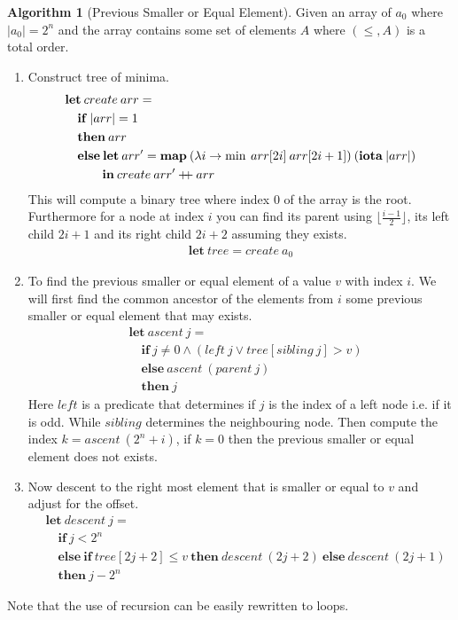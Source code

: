 \documentclass[a4paper,12pt]{article}
\newcommand\concat{\: \mathrlap{+} \: +}
\theoremstyle{definition}
\newtheorem{algorithm}{Algorithm}[section]
\begin{document}
\begin{algorithm}[Previous Smaller or Equal Element]\label{algo:psee}
  Given an array of $a_0$ where $|a_0| = 2^n$ and the array contains some set of elements $A$ where $(\leq, A)$ is a total order.
  \begin{enumerate}
    \item Construct tree of minima.
    \begin{align*}
      &\mathbf{let} \: create \: arr = \\
      &\quad \mathbf{if} \: |arr| = 1 \\
      &\quad \mathbf{then} \: arr \\
      &\quad \mathbf{else} \: \mathbf{let} \: arr' = \mathbf{map} \: (\lambda i \to \min \: arr[2i] \: arr[2i + 1] ) \: (\mathbf{iota} \: |arr|) \\
      &\quad \quad \quad \mathbf{in} \: create \: arr' \concat  arr
    \end{align*}
    This will compute a binary tree where index $0$ of the array is the root. Furthermore for a node at index $i$ you can find its parent using $\lfloor \frac{i - 1}{2} \rfloor$, its left child $2i + 1$ and its right child $2i + 2$ assuming they exists.
    \begin{align*}
      \mathbf{let} \: tree = create \: a_0
    \end{align*}
    \item To find the previous smaller or equal element of a value $v$ with index $i$. We will first find the common ancestor of the elements from $i$ some previous smaller or equal element that may exists. 
    \begin{align*}
      &\mathbf{let} \: ascent \: j = \\
      &\quad \mathbf{if} \: j \neq 0 \land (left \: j \lor tree[sibling \: j] > v) \\
      &\quad \mathbf{else} \: ascent \: (parent \: j) \\
      &\quad \mathbf{then} \: j
    \end{align*}
    Here $left$ is a predicate that determines if $j$ is the index of a left node i.e. if it is odd. While $sibling$ determines the neighbouring node. Then compute the index $k = ascent \: (2^n + i)$, if $k = 0$ then the previous smaller or equal element does not exists.
    \item Now descent to the right most element that is smaller or equal to $v$ and adjust for the offset.
    \begin{align*}
      &\mathbf{let} \: descent \: j = \\
      &\quad \mathbf{if} \: j < 2^n \\
      &\quad \mathbf{else} \: \mathbf{if} \: tree[2j + 2] \leq v \: \mathbf{then} \: descent \: (2j + 2) \: \mathbf{else} \: descent \: (2j + 1)\\
      &\quad \mathbf{then} \: j - 2^n
    \end{align*}
  \end{enumerate}
\end{algorithm}
Note that the use of recursion can be easily rewritten to loops.
\end{document}
